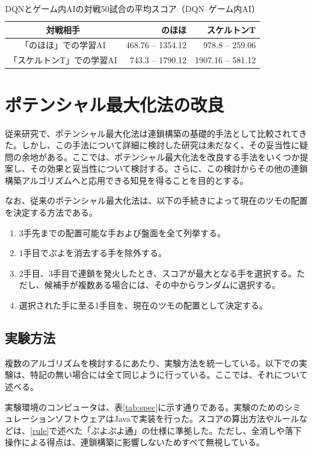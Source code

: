 \documentclass[12pt]{jreport}
\begin{document}
\begin{table}[tb]
\begin{center}
\caption{DQNとゲーム内AIの対戦50試合の平均スコア（DQN--ゲーム内AI）} \label{tab:dqn_score_vs}
\begin{tabular}{|c|r|r|} \hline
対戦相手 & のほほ & スケルトンT\\ \hline
「のほほ」での学習AI & 468.76 -- 1354.12 & 978.8 -- 259.06\\ \hline
「スケルトンT」での学習AI & 743.3 -- 1790.12 & 1907.16 -- 581.12\\ \hline
\end{tabular}
\end{center}
\end{table}


\chapter{ポテンシャル最大化法の改良} \label{potential} \setcounter{section}{0}
従来研究で、ポテンシャル最大化法は連鎖構築の基礎的手法として比較されてきた。しかし、この手法について詳細に検討した研究は未だなく、その妥当性に疑問の余地がある。ここでは、ポテンシャル最大化法を改良する手法をいくつか提案し、その効果と妥当性について検討する。さらに、この検討からその他の連鎖構築アルゴリズムへと応用できる知見を得ることを目的とする。

なお、従来のポテンシャル最大化法は、以下の手続きによって現在のツモの配置を決定する方法である。
\begin{enumerate}
\item 3手先までの配置可能な手および盤面を全て列挙する。
\item 1手目でぷよを消去する手を除外する。
\item 2手目、3手目で連鎖を発火したとき、スコアが最大となる手を選択する。ただし、候補手が複数ある場合には、その中からランダムに選択する。
\item 選択された手に至る1手目を、現在のツモの配置として決定する。
\end{enumerate}

\section{実験方法}
複数のアルゴリズムを検討するにあたり、実験方法を統一している。以下での実験は、特記の無い場合には全て同じように行っている。ここでは、それについて述べる。

実験環境のコンピュータは、表\ref{tab:spec}に示す通りである。実験のためのシミュレーションソフトウェアはJavaで実装を行った。スコアの算出方法やルールなどは、\ref{rule}で述べた「ぷよぷよ通」の仕様に準拠した。ただし、全消しや落下操作による得点は、連鎖構築に影響しないためすべて無視している。
\end{document}
